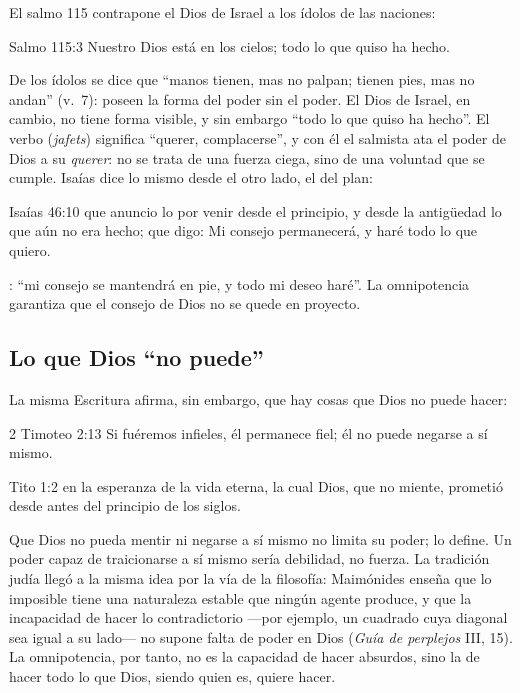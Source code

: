 El salmo 115 contrapone el Dios de Israel a los ídolos de las naciones:

\begin{verso}{Salmo 115:3}
Nuestro Dios está en los cielos; todo lo que quiso ha hecho.
\end{verso}

De los ídolos se dice que ``manos tienen, mas no palpan; tienen pies, mas no andan'' (v.~7): poseen la forma del poder sin el poder. El Dios de Israel, en cambio, no tiene forma visible, y sin embargo ``todo lo que quiso ha hecho''. El verbo  (\emph{jafets}) significa ``querer, complacerse'', y con él el salmista ata el poder de Dios a su \emph{querer}: no se trata de una fuerza ciega, sino de una voluntad que se cumple. Isaías dice lo mismo desde el otro lado, el del plan:

\begin{verso}{Isaías 46:10}
que anuncio lo por venir desde el principio, y desde la antigüedad lo que aún no era hecho; que digo: Mi consejo permanecerá, y haré todo lo que quiero.
\end{verso}

: ``mi consejo se mantendrá en pie, y todo mi deseo haré''. La omnipotencia garantiza que el consejo de Dios no se quede en proyecto.

\subsection{Lo que Dios “no puede”}

La misma Escritura afirma, sin embargo, que hay cosas que Dios no puede hacer:

\begin{verso}{2 Timoteo 2:13}
Si fuéremos infieles, él permanece fiel; él no puede negarse a sí mismo.
\end{verso}

\begin{verso}{Tito 1:2}
en la esperanza de la vida eterna, la cual Dios, que no miente, prometió desde antes del principio de los siglos.
\end{verso}

Que Dios no pueda mentir ni negarse a sí mismo no limita su poder; lo define. Un poder capaz de traicionarse a sí mismo sería debilidad, no fuerza. La tradición judía llegó a la misma idea por la vía de la filosofía: Maimónides enseña que lo imposible tiene una naturaleza estable que ningún agente produce, y que la incapacidad de hacer lo contradictorio ---por ejemplo, un cuadrado cuya diagonal sea igual a su lado--- no supone falta de poder en Dios (\emph{Guía de perplejos} III, 15). La omnipotencia, por tanto, no es la capacidad de hacer absurdos, sino la de hacer todo lo que Dios, siendo quien es, quiere hacer.

